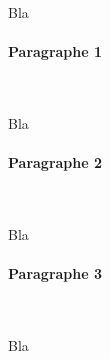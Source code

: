 Bla


\paragraph*{Paragraphe 1}
~\\
\hskip7mm

Bla

\paragraph*{Paragraphe 2}
~\\
\hskip7mm

Bla

\paragraph*{Paragraphe 3}
~\\
\hskip7mm

Bla